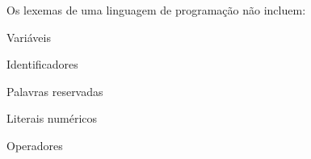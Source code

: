 \question[10]

Os lexemas de uma linguagem de programação não incluem:

\begin{choices}
\item Variáveis %
\item Identificadores
\item Palavras reservadas
\item Literais numéricos
\item Operadores
\end{choices}
\answerline

